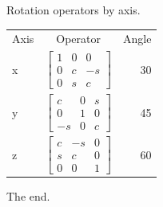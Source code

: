 \documentclass{article}
\begin{document}
Rotation operators by axis.

\begin{tabular}{l c r}
Axis & Operator & Angle \\
x & $\begin{bmatrix}1&0&0\\0&c&-s\\0&s&c\end{bmatrix}$ & 30 \\
y & $\begin{bmatrix}c&0&s\\0&1&0\\-s&0&c\end{bmatrix}$ & 45 \\
z & $\begin{bmatrix}c&-s&0\\s&c&0\\0&0&1\end{bmatrix}$ & 60 \\
\end{tabular}

The end.
\end{document}
